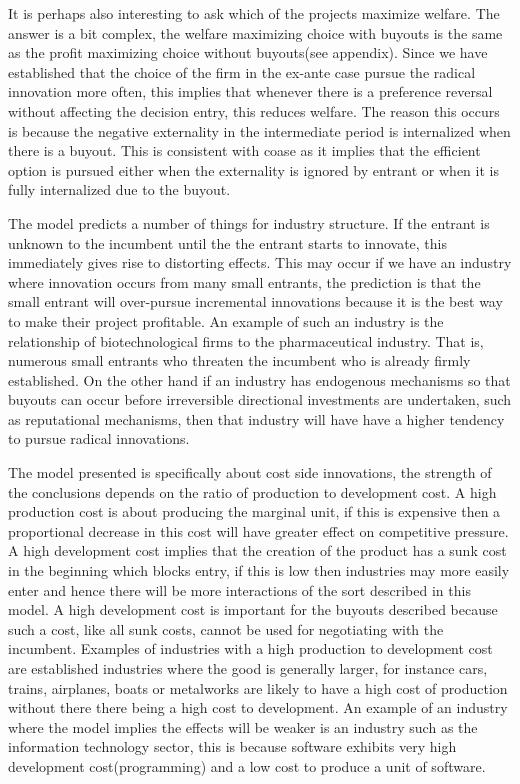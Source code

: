 \documentclass[12pt]{report}
\numberwithin{equation}{section}
\begin{document}
It is perhaps also interesting to ask which of the projects maximize welfare. The answer is a bit complex, the welfare maximizing choice with buyouts is the same as the profit maximizing choice without buyouts(see appendix). Since we have established that the choice of the firm in the ex-ante case pursue the radical innovation more often, this implies that whenever there is a preference reversal without affecting the decision entry, this reduces welfare. The reason this occurs is because the negative externality in the intermediate period is internalized when there is a buyout. This is consistent with coase as it implies that the efficient option is pursued either when the externality is ignored by entrant or when it is fully internalized due to the buyout.

The model predicts a number of things for industry structure. If the entrant is unknown to the incumbent until the the entrant starts to innovate, this immediately gives rise to distorting effects.  This may occur if we have an industry where innovation occurs from many small entrants, the prediction is that the small entrant will over-pursue incremental innovations because it is the best way to make their project profitable. An example of such an industry is the relationship of biotechnological firms to the pharmaceutical industry. That is, numerous small entrants who threaten the incumbent who is already firmly established. On the other hand if an industry has endogenous mechanisms so that buyouts can occur before irreversible directional investments are undertaken, such as reputational mechanisms, then that industry will have have a higher tendency to pursue radical innovations. 

The model presented is specifically about cost side innovations, the strength of the conclusions depends on the ratio of production to development cost. A high production cost is about producing the marginal unit, if this is expensive then a proportional decrease in this cost will have greater effect on competitive pressure. A high development cost implies that the creation of the product has a sunk cost in the beginning which blocks entry, if this is low then industries may more easily enter and hence there will be more interactions of the sort described in this model. A high development cost is important for the buyouts described because such a cost, like all sunk costs, cannot be used for negotiating with the incumbent. Examples of industries with a high production to development cost are established industries where the good is generally larger, for instance cars, trains, airplanes, boats or metalworks are likely to have a high cost of production without there there being a high cost to development. An example of an industry where the model implies the effects will be weaker is an industry such as the information technology sector, this is because software exhibits very high development cost(programming) and a low cost to produce a unit of software.  
\end{document}
